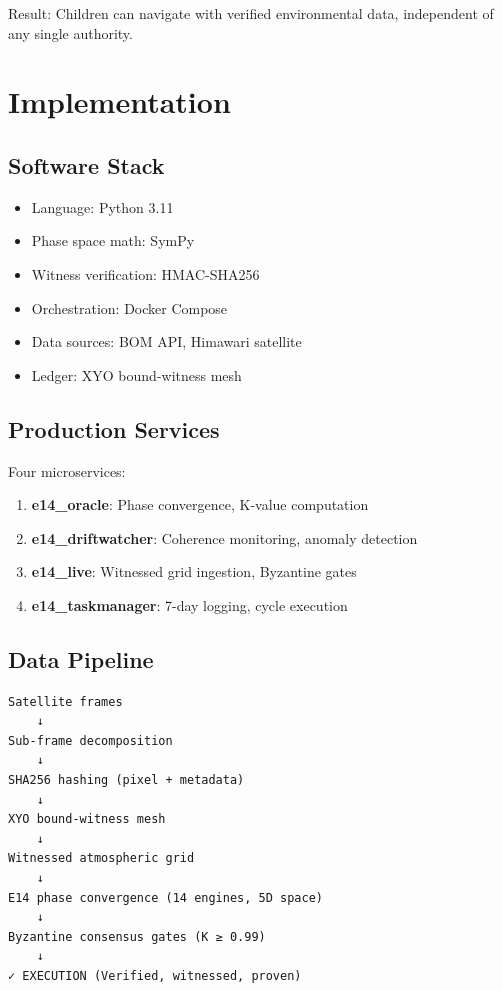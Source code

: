 \documentclass[11pt]{article}
\begin{document}
Result: Children can navigate with verified environmental data, independent of any single authority.

\section{Implementation}

\subsection{Software Stack}

\begin{itemize}
    \item Language: Python 3.11
    \item Phase space math: SymPy
    \item Witness verification: HMAC-SHA256
    \item Orchestration: Docker Compose
    \item Data sources: BOM API, Himawari satellite
    \item Ledger: XYO bound-witness mesh
\end{itemize}

\subsection{Production Services}

Four microservices:

\begin{enumerate}
    \item \textbf{e14\_oracle}: Phase convergence, K-value computation
    \item \textbf{e14\_driftwatcher}: Coherence monitoring, anomaly detection
    \item \textbf{e14\_live}: Witnessed grid ingestion, Byzantine gates
    \item \textbf{e14\_taskmanager}: 7-day logging, cycle execution
\end{enumerate}

\subsection{Data Pipeline}

\begin{lstlisting}
Satellite frames
    ↓
Sub-frame decomposition
    ↓
SHA256 hashing (pixel + metadata)
    ↓
XYO bound-witness mesh
    ↓
Witnessed atmospheric grid
    ↓
E14 phase convergence (14 engines, 5D space)
    ↓
Byzantine consensus gates (K ≥ 0.99)
    ↓
✓ EXECUTION (Verified, witnessed, proven)
\end{lstlisting}
\end{document}

